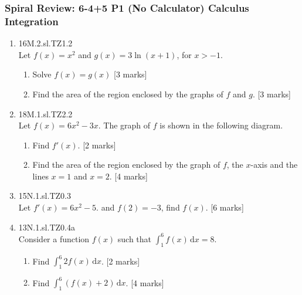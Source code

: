 \documentclass[12pt, twoside]{article}
\begin{document}
\subsubsection*{Spiral Review: 6-4+5 P1 (No Calculator) Calculus Integration}
 \begin{enumerate}

   \item 16M.2.sl.TZ1.2\\
   Let $f(x)=x^2$ and $g(x)=3 \ln (x+1)$, for $x>-1$.
   \begin{enumerate}
     \item Solve $f(x)=g(x)$ [3 marks]
     \item Find the area of the region enclosed by the graphs of $f$ and $g$. [3 marks]
   \end{enumerate}

  \item 18M.1.sl.TZ2.2\\
  Let $f(x)=6x^2-3x$. The graph of $f$ is shown in the following diagram.
    \begin{center}
    \end{center}
    \begin{enumerate}
      \item Find $f'(x)$. [2 marks]
      \item Find the area of the region enclosed by the graph of $f$, the $x$-axis and the lines $x = 1$ and $x = 2$. [4 marks]
    \end{enumerate}

    \item 15N.1.sl.TZ0.3\\
    Let $f'(x)=6x^2-5$. and $f(2)=-3$, find $f(x)$. [6 marks]

    \item 13N.1.sl.TZ0.4a\\
    Consider a function $f(x)$ such that $\int_1^6 f(x) \,\mathrm{d}x
=8$.
    \begin{enumerate}
      \item Find $\int_1^6 2f(x) \,\mathrm{d}x$. [2 marks]
      \item Find $\int_1^6 (f(x)+2) \,\mathrm{d}x$. [4 marks]
    \end{enumerate}


\end{enumerate}
\end{document}
